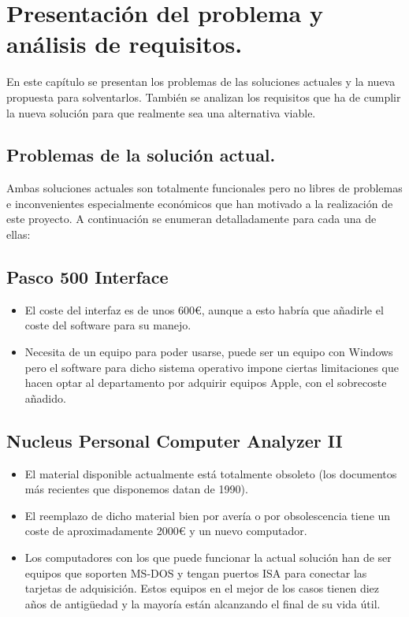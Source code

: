 \chapter{Presentación del problema y análisis de requisitos.}

En este capítulo se presentan los problemas de las soluciones actuales y la nueva propuesta para solventarlos. También se analizan los requisitos que ha de cumplir la nueva solución para que realmente sea una alternativa viable.
\section{Problemas de la solución actual.}
Ambas soluciones actuales son totalmente funcionales pero no libres de problemas e inconvenientes especialmente económicos que han motivado a la realización de este proyecto. A continuación se enumeran detalladamente para cada una de ellas:

\section*{Pasco 500 Interface}
\begin{itemize}
	\item El coste del interfaz es de unos 600€, aunque a esto habría que añadirle el coste del software para su manejo.
	\item Necesita de un equipo para poder usarse, puede ser un equipo con Windows pero el software para dicho sistema operativo impone ciertas limitaciones que hacen optar al departamento por adquirir equipos Apple, con el sobrecoste añadido.
\end{itemize}
\section*{Nucleus Personal Computer Analyzer II}
\begin{itemize}
	\item El material disponible actualmente está totalmente obsoleto (los documentos más recientes que disponemos datan de 1990).
	\item El reemplazo de dicho material bien por avería o por obsolescencia tiene un coste de aproximadamente 2000€ y un nuevo computador.
	\item Los computadores con los que puede funcionar la actual solución han de ser equipos que soporten MS-DOS y tengan puertos ISA para conectar las tarjetas de adquisición. Estos equipos en el mejor de los casos tienen diez años de antigüedad y la mayoría están alcanzando el final de su vida útil.
\end{itemize}

